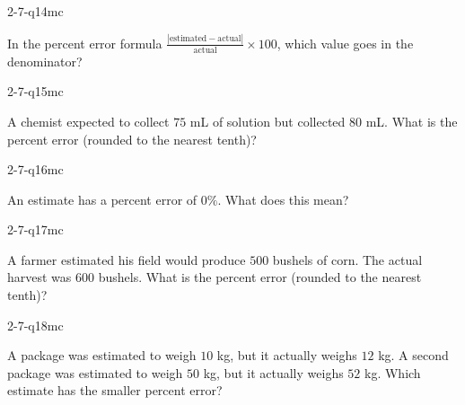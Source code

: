 \begin{practiceQuestion}{2-7-q14}{mc}
\begin{questionText}
In the percent error formula $\frac{|\text{estimated} - \text{actual}|}{\text{actual}} \times 100$, which value goes in the denominator?
\end{questionText}
\end{practiceQuestion}

\begin{practiceQuestion}{2-7-q15}{mc}
\begin{questionText}
A chemist expected to collect $75$ mL of solution but collected $80$ mL. What is the percent error (rounded to the nearest tenth)?
\end{questionText}
\end{practiceQuestion}

\begin{practiceQuestion}{2-7-q16}{mc}
\begin{questionText}
An estimate has a percent error of $0\%$. What does this mean?
\end{questionText}
\end{practiceQuestion}

\begin{practiceQuestion}{2-7-q17}{mc}
\begin{questionText}
A farmer estimated his field would produce $500$ bushels of corn. The actual harvest was $600$ bushels. What is the percent error (rounded to the nearest tenth)?
\end{questionText}
\end{practiceQuestion}

\begin{practiceQuestion}{2-7-q18}{mc}
\begin{questionText}
A package was estimated to weigh $10$ kg, but it actually weighs $12$ kg. A second package was estimated to weigh $50$ kg, but it actually weighs $52$ kg. Which estimate has the smaller percent error?
\end{questionText}
\end{practiceQuestion}

